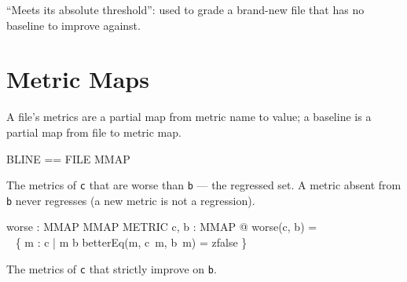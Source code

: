 \documentclass[a4paper,10pt,fleqn]{article}
\begin{document}

``Meets its absolute threshold'': used to grade a brand-new file that has
no baseline to improve against.


\section{Metric Maps}

A file's metrics are a partial map from metric name to value; a baseline
is a partial map from file to metric map.


\begin{zed}
BLINE == FILE \pfun MMAP
\end{zed}

The metrics of \texttt{c} that are worse than \texttt{b} --- the regressed
set. A metric absent from \texttt{b} never regresses (a new metric is not
a regression).

\begin{axdef}
worse : MMAP \cross MMAP \fun \finset METRIC
\where
\forall c, b : MMAP @ worse(c, b) = \\
\quad~ \{ m : \dom c | m \in \dom b \land betterEq(m, c~m, b~m) = zfalse \}
\end{axdef}

The metrics of \texttt{c} that strictly improve on \texttt{b}.
\end{document}
